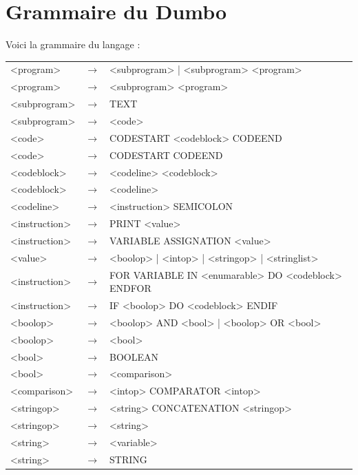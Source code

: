 \documentclass[10pt,a4paper]{article}
\begin{document}
	\section{Grammaire du Dumbo}
	Voici la grammaire du langage :\\
	\begin{tabular}{|l l l|}
		\hline
		
		<program> & $\longrightarrow$ & <subprogram> | <subprogram> <program>\\
		<program> & $\longrightarrow$ & <subprogram> <program>\\
		<subprogram> & $\longrightarrow$ & TEXT\\
		<subprogram> & $\longrightarrow$ & <code>\\
		<code> & $\longrightarrow$ & CODESTART <codeblock> CODEEND\\
		<code> & $\longrightarrow$ & CODESTART CODEEND\\
		<codeblock> & $\longrightarrow$ & <codeline> <codeblock>\\
		<codeblock> & $\longrightarrow$ & <codeline> \\
		<codeline> & $\longrightarrow$ & <instruction> SEMICOLON\\
		<instruction> & $\longrightarrow$ & PRINT <value>\\
		<instruction> & $\longrightarrow$ & VARIABLE ASSIGNATION <value>\\
		<value> & $\longrightarrow$ & <boolop> | <intop> | <stringop> | <stringlist>\\
		<instruction> & $\longrightarrow$ & FOR VARIABLE IN <enumarable> DO <codeblock> ENDFOR\\
		<instruction> & $\longrightarrow$ & IF <boolop> DO <codeblock> ENDIF\\
		<boolop> & $\longrightarrow$ & <boolop> AND <bool> | <boolop> OR <bool>\\
		<boolop> & $\longrightarrow$ & <bool>\\
		<bool> & $\longrightarrow$ & BOOLEAN\\
		<bool> & $\longrightarrow$ & <comparison>\\
		<comparison> & $\longrightarrow$ & <intop> COMPARATOR <intop>\\
		<stringop> & $\longrightarrow$ & <string> CONCATENATION <stringop>\\
		<stringop> & $\longrightarrow$ & <string>\\
		<string> & $\longrightarrow$ & <variable>\\
		<string> & $\longrightarrow$ & STRING\\

\end{tabular}
\end{document}
